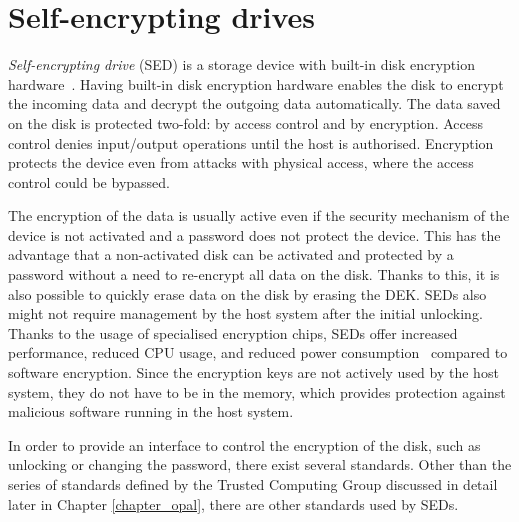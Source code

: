 \section{Self-encrypting drives}

\emph{Self-encrypting drive} (SED) is a storage device with built-in disk encryption hardware~\cite{tcg-use-case-white-paper}. Having built-in disk encryption hardware enables the disk to encrypt the incoming data and decrypt the outgoing data automatically. 
The data saved on the disk is protected two-fold: by access control and by encryption.
Access control denies input/output operations until the host is authorised.
Encryption protects the device even from attacks with physical access, where the access control could be bypassed.

The encryption of the data is usually active even if the security mechanism of the device is not activated and a password does not protect the device. This has the advantage that a non-activated disk can be activated and protected by a password without a need to re-encrypt all data on the disk. 
Thanks to this, it is also possible to quickly erase data on the disk by erasing the DEK.
SEDs also might not require management by the host system after the initial unlocking. 
Thanks to the usage of specialised encryption chips, SEDs offer increased performance, reduced CPU usage, and reduced power consumption~\cite{comparing_the_power} compared to software encryption.
Since the encryption keys are not actively used by the host system, they do not have to be in the memory, which provides protection against malicious software running in the host system. 

In order to provide an interface to control the encryption of the disk, such as unlocking or changing the password, there exist several standards. Other than the series of standards defined by the Trusted Computing Group discussed in detail later in Chapter \ref{chapter_opal}, there are other standards used by SEDs.





